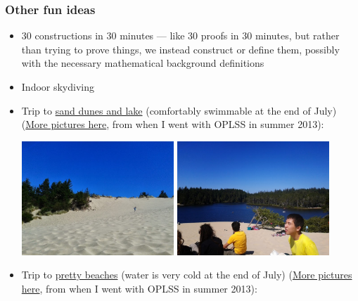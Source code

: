 \documentclass{article}
\begin{document}
\subsubsection*{Other fun ideas}
\begin{itemize}
  \item 30 constructions in 30 minutes --- like 30 proofs in 30 minutes, but rather than trying to prove things, we instead construct or define them, possibly with the necessary mathematical background definitions
  \item Indoor skydiving
  \item Trip to \href{https://maps.google.com/?ll=43.929565309931085,-124.11577032281491&q=43.929565309931085,-124.11577032281491}{sand dunes and lake} (comfortably swimmable at the end of July) (\href{https://plus.google.com/photos/103416070288920608429/albums/5905882242979530833/5905882882578571666?authkey=CNrZu8S0s6yvgQE&pid=5905882882578571666&oid=103416070288920608429}{More pictures here}, from when I went with OPLSS in summer 2013):
  \begin{center}
    \includegraphics[width=0.45\textwidth]{2013-07-28-15-30-37.jpg}
    \includegraphics[width=0.45\textwidth]{2013-07-28-15-30-53.jpg}
  \end{center}
  \clearpage
  \item Trip to \href{https://maps.google.com/maps?q=44.134686,-124.123456&hl=en&sll=44.032101,-124.112077&sspn=0.288791,0.676346&t=h&dirflg=w&z=16}{pretty beaches} (water is very cold at the end of July) (\href{https://plus.google.com/photos/103416070288920608429/albums/5905882242979530833/5905893435660061586?authkey=CNrZu8S0s6yvgQE&pid=5905893435660061586&oid=103416070288920608429}{More pictures here}, from when I went with OPLSS in summer 2013):

\end{itemize}
\end{document}
